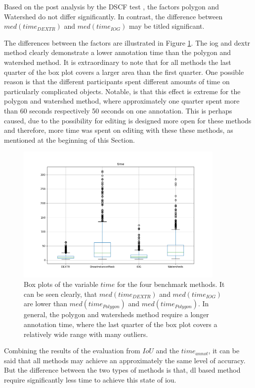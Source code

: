 Based on the post analysis by the DSCF test \cite{CF91-dscf}, the factors polygon and Watershed do not differ significantly.
In contrast, the difference between $ med \left( time_{DEXTR} \right) $ and $ med \left( time_{IOG} \right) $ may be titled significant.

The differences between the factors are illustrated in Figure \ref{fig:ch5:sec1:time_box_plot}.
The \gls{iog} and \gls{dextr} method clearly demonstrate a lower annotation time than the polygon and watershed method.
It is extraordinary to note that for all methods the last quarter of the box plot covers a larger area than the first quarter.
One possible reason is that the different participants spent different amounts of time on particularly complicated objects.
Notable, is that this effect is extreme for the polygon and watershed method, where approximately one quarter spent more than 60 seconds respectively 50 seconds on one annotation. 
This is perhaps caused, due to the possibility for editing is designed more open for these methods and therefore, more time was spent on editing with these these methods, as mentioned at the beginning of this Section.

\begin{figure}
	\centering
	\includegraphics[width=0.9\textwidth]{figures/chap51_time_boxplot.png}
	\caption[Box plots of the methods on $ IoU  $]{
		Box plots of the variable $ time $ for the four benchmark methods.
		It can be seen clearly, that $ med \left( time_{DEXTR} \right) $ and $ med \left( time_{IOG} \right) $ are lower than $ med \left( time_{Polygon} \right) $ and $ med \left( time_{Polygon} \right) $.
		In general, the polygon and watersheds method require a longer annotation time, where the last quarter of the box plot covers a relatively wide range with many outliers. 
	} \label{fig:ch5:sec1:time_box_plot}
\end{figure}


Combining the results of the evaluation from $ IoU $ and the $ time_{annot} $, it can be said that all methods may achieve an approximately the same level of accuracy.
But the difference between the two types of methods is that, \gls{dl} based method require significantly less time to achieve this state of \gls{iou}.




